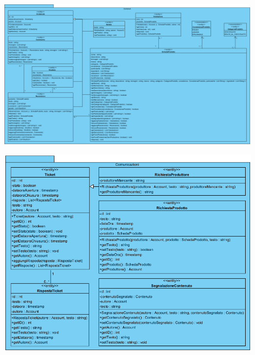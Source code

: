 \begin{landscape}
\begin{center}
			\includegraphics[width=\linewidth]{assets/visualParadigm/classi/Contenuti}
\end{center}
\end{landscape}

\begin{center}
			\includegraphics[width=\textwidth]{assets/visualParadigm/classi/Comunicazioni}
\end{center}

